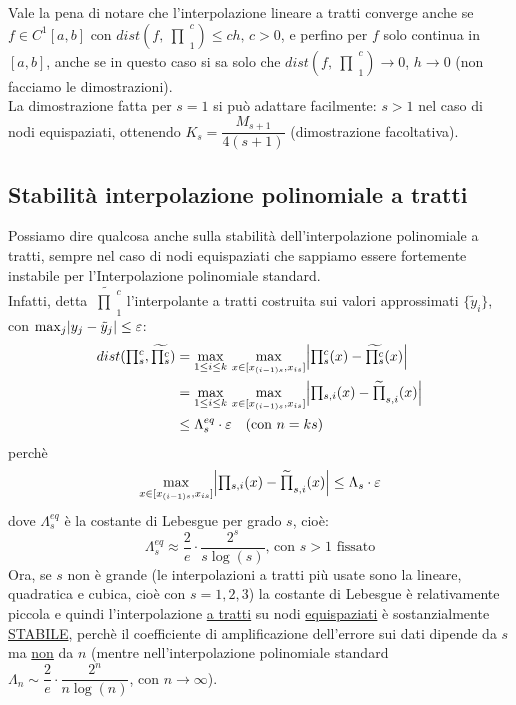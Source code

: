 \documentclass[12pt,a4paper]{article}
\DeclarePairedDelimiter{\abs}{\lvert}{\rvert}
\newcommand{\inter}{\begin{matrix}\prod\end{matrix}}
\begin{document}
\bigskip
Vale la pena di notare che l'interpolazione lineare a tratti converge anche se $f \in C^1[a,b]$ con $dist(f,\inter_1^c)\leq ch, \, c>0$, e perfino per $f$ solo continua in $[a,b]$, anche se in questo caso si sa solo che $dist(f,\inter_1^c) \rightarrow 0$, $h \rightarrow 0$ (non facciamo le dimostrazioni).\\
La dimostrazione fatta per $s=1$ si può adattare facilmente: $s>1$ nel caso di nodi equispaziati, ottenendo $K_s=\dfrac{M_{s+1}}{4(s+1)}$ (dimostrazione facoltativa).

\subsection{Stabilità interpolazione polinomiale a tratti}
Possiamo dire qualcosa anche sulla stabilità dell'interpolazione polinomiale a tratti, sempre nel caso di nodi equispaziati che sappiamo essere fortemente instabile per l'Interpolazione polinomiale standard.\\ \vspace{0.1cm}
Infatti, detta $\widetilde{\inter_1^c}$ l'interpolante a tratti costruita sui valori approssimati $\{\tilde{y}_i\}$, con $\max_j \abs{y_j-\tilde{y}_j}\leq \varepsilon$:
\[ \begin{split}
    dist(\inter_s^c,\widetilde{\inter_s^c}) & = \max_{1 \le i \le k}\, \max_{x \in [x_{(i-1)s},x_{is}]} \abs*{\inter_s^c(x)-\widetilde{\inter_s^c}(x)} \\
    & = \max_{1 \le i \le k}\, \max_{x \in [x_{(i-1)s},x_{is}]} \abs*{\inter_{s,i}(x)-\widetilde{\inter}_{s,i}(x)} \\
    & \leq \Lambda_s^{eq}\cdot \varepsilon \quad (\text{con } n = ks)
\end{split} \]
perchè
\[\max_{x \in [x_{(i-1)s},x_{is}]}  \abs*{\inter_{s,i}(x)-\widetilde{\inter}_{s,i}(x)}\leq \Lambda_s \cdot \varepsilon\] 
dove $\Lambda_s^{eq}$ è la costante di Lebesgue per grado $s$, cioè:
\[ \Lambda_s^{eq} \approx \dfrac{2}{e} \cdot \dfrac{2^s}{s \log(s)} \text{, con } s>1 \text{ fissato} \]
Ora, se $s$ non è grande (le interpolazioni a tratti più usate sono la lineare, quadratica e cubica, cioè con $s=1,2,3$) la costante di Lebesgue è relativamente piccola e quindi l'interpolazione \uline{a tratti} su nodi \uline{equispaziati} è sostanzialmente \uline{STABILE}, perchè il coefficiente di amplificazione dell'errore sui dati dipende da $s$ ma \uline{non} da $n$ (mentre nell'interpolazione polinomiale standard $\Lambda_n \sim \dfrac{2}{e} \cdot \dfrac{2^n}{n \log(n)}$, con $n \to \infty$).\\
\end{document}
